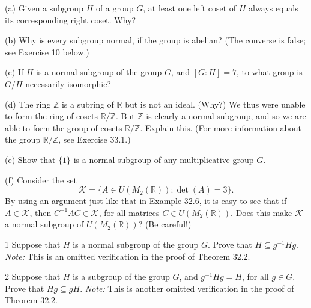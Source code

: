 \begin{problem}[Warmup]{(a)}
    Given a subgroup $H$ of a group $G$, at least one left coset of $H$ always equals its corresponding right coset. Why?
\end{problem}
\unsolved

\begin{problem}[Warmup]{(b)}
    Why is every subgroup normal, if the group is abelian? (The converse is false; see Exercise 10 below.)
\end{problem}
\unsolved

\begin{problem}[Warmup]{(c)}
    If $H$ is a normal subgroup of the group $G$, and $[G : H] = 7$, to what group is $G/H$ necessarily isomorphic?
\end{problem}
\unsolved

\begin{problem}[Warmup]{(d)}
    The ring $\mathbb{Z}$ is a subring of $\mathbb{R}$ but is not an ideal. (Why?) We thus were unable to form the ring of cosets $\mathbb{R}/\mathbb{Z}$. But $\mathbb{Z}$ is clearly a normal subgroup, and so we are able to form the group of cosets $\mathbb{R}/\mathbb{Z}$. Explain this. (For more information about the group $\mathbb{R}/\mathbb{Z}$, see Exercise 33.1.)
\end{problem}
\unsolved

\begin{problem}[Warmup]{(e)}
    Show that $\{1\}$ is a normal subgroup of any multiplicative group $G$.
\end{problem}
\unsolved

\begin{problem}[Warmup]{(f)}
    Consider the set \[\mathcal{K} = \{A \in U(M_2(\mathbb{R})) : \det(A) = 3\}.\] By using an argument just like that in Example 32.6, it is easy to see that if $A \in \mathcal{K}$, then $C^{-1}AC \in \mathcal{K}$, for all matrices $C \in U(M_2(\mathbb{R}))$. Does this make $\mathcal{K}$ a normal subgroup of $U(M_2(\mathbb{R}))$? (Be careful!)
\end{problem}
\unsolved

\begin{problem}{1}
    Suppose that $H$ is a normal subgroup of the group $G$. Prove that
    $H \subseteq g^{-1}Hg$. \emph{Note:} This is an omitted verification in the proof of
    Theorem 32.2.
\end{problem}
\unsolved

\begin{problem}{2}
    Suppose that $H$ is a subgroup of the group $G$, and $g^{-1}Hg = H$, for all $g \in G$.
    Prove that $Hg \subseteq gH$. \emph{Note:} This is another omitted verification in the
    proof of Theorem 32.2.
\end{problem}
\unsolved

